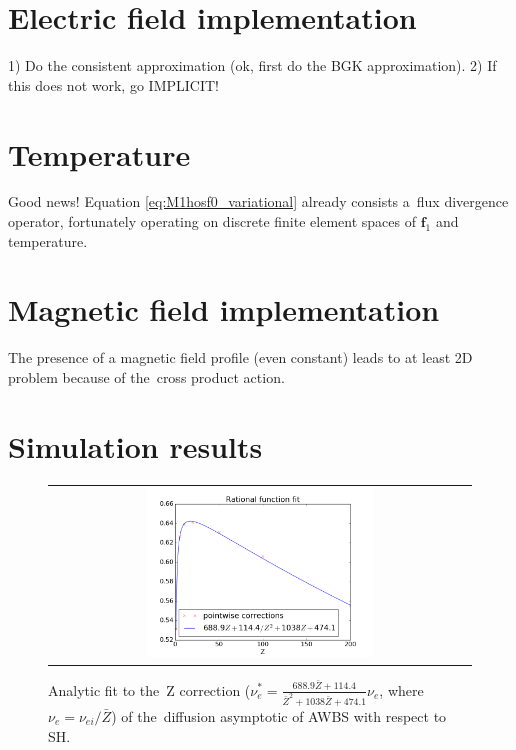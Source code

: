\documentclass[preprint,12pt]{elsarticle}
\newcommand{\vect}[1]{\boldsymbol{#1}}
\newcommand{\Zbar}{\bar{Z}}
\newcommand{\nue}{\nu_{e}}
\newcommand{\nuei}{\nu_{ei}}
\newcommand{\fone}{\vect{f}_1}
\begin{document}
\section{Electric field implementation}\label{sec:Efield}
1) Do the consistent approximation (ok, first do the BGK approximation).
2) If this does not work, go IMPLICIT!

\section{Temperature}\label{sec:Temperature}
Good news! Equation \eqref{eq:M1hosf0_variational} already consists 
a~flux divergence operator, fortunately operating on discrete finite element 
spaces of $\fone$ and temperature. 

\section{Magnetic field implementation}\label{sec:Bfield}
The presence of a magnetic field profile (even constant) leads to at least 2D 
problem because of the~cross product action.

\pagebreak

\section{Simulation results}\label{sec:results}
\begin{figure}[tbh]
  \begin{center}
    \begin{tabular}{c}
      \includegraphics[width=0.55\textwidth]{../results/fe_analysis/figs/AWBScorrection_fit.png} 
    \end{tabular}
  \caption{
  Analytic fit to the~Z correction 
  ($\nue^* = \frac{688.9 \Zbar + 114.4}{\Zbar^2 + 
  1038 \Zbar + 474.1} \nue$, where $\nue = \nuei / \Zbar$) 
  of the~diffusion asymptotic of AWBS with respect to SH.
  }
  \end{center}
  \label{fig:AWBScorrection_f1}
\end{figure}
\end{document}
